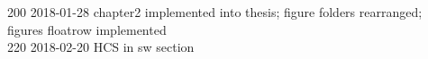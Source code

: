 \begin{footnotesize}
200	2018-01-28	chapter2 implemented into thesis; figure folders rearranged; figures floatrow implemented\\
220	2018-02-20	HCS in sw section\\

\end{footnotesize}
